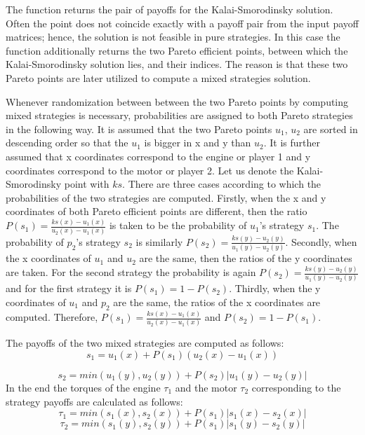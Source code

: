 The function returns the pair of payoffs for the Kalai-Smorodinsky solution. Often the point does not coincide exactly with a payoff pair from the input payoff matrices; hence, the solution is not feasible in pure strategies. In this case the function additionally returns the two Pareto efficient points, between which the Kalai-Smorodinsky solution lies, and their indices. The reason is that these two Pareto points are later utilized to compute a mixed strategies solution.

Whenever randomization between between the two Pareto points by computing mixed strategies is necessary, probabilities are assigned to both Pareto strategies in the following way. It is assumed that the two Pareto points $u_1$, $u_2$ are sorted in descending order so that the $u_1$ is bigger in x and y than $u_2$. It is further assumed that x coordinates correspond to the engine or player 1 and y coordinates correspond to the motor or player 2. Let us denote the Kalai-Smorodinsky point with $ks$. There are three cases according to which the probabilities of the two strategies are computed. Firstly, when the x and y coordinates of both Pareto efficient points are different, then the ratio $P(s_1) = \frac{ks(x) - u_1(x)}{u_2(x) - u_1(x)}$ is taken to be the probability of $u_1$'s strategy $s_1$. The probability of $p_2$'s strategy $s_2$ is similarly $P(s_2) = \frac{ks(y) - u_2(y)}{u_1(y) - u_2(y)}$. Secondly, when the x coordinates of $u_1$ and $u_2$ are the same, then the ratios of the y coordinates are taken. For the second strategy the probability is again $P(s_2) = \frac{ks(y) - u_2(y)}{u_1(y) - u_2(y)}$ and for the first strategy it is $P(s_1) = 1 - P(s_2)$. Thirdly, when the y coordinates of $u_1$ and $p_2$ are the same, the ratios of the x coordinates are computed. Therefore, $P(s_1) =  \frac{ks(x) - u_1(x)}{u_2(x) - u_1(x)}$ and $P(s_2) = 1 - P(s_1)$.

The payoffs of the two mixed strategies are computed as follows:
\begin{equation}
s_1 = u_1(x) + P(s_1)(u_2(x) - u_1(x))
\end{equation} 

\begin{equation}
s_2 = min(u_1(y), u_2(y)) + P(s_2)|u_1(y) - u_2(y)|
\end{equation}
In the end the torques of the engine $\tau_1$ and the motor $\tau_2$ corresponding to the strategy payoffs are calculated as follows:
\begin{equation}
\tau_1 = min(s_1(x), s_2(x)) + P(s_1)|s_1(x) - s_2(x)|
\end{equation}
\begin{equation}
\tau_2 = min(s_1(y), s_2(y)) + P(s_1)|s_1(y) - s_2(y)|
\end{equation}

